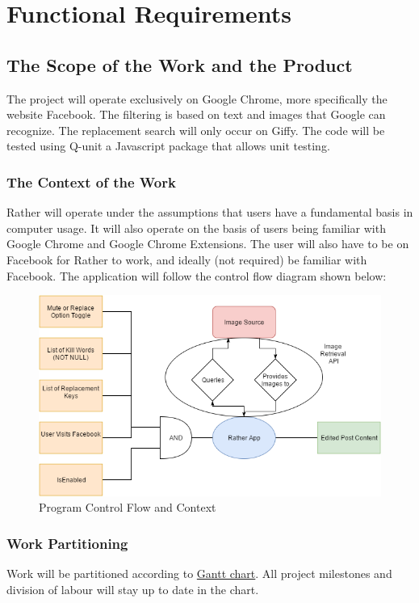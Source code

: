 \documentclass[12pt, titlepage]{article}
\begin{document}
\section{Functional Requirements}


\subsection{The Scope of the Work and the Product}
The project will operate exclusively on Google Chrome, more specifically the website Facebook. The filtering is based on text and images that Google can recognize. The replacement search will only occur on Giffy. The code will be tested using Q-unit a Javascript package that allows unit testing.

\subsubsection{The Context of the Work}
Rather will operate under the assumptions that users have a fundamental basis in computer usage. It will also operate on the basis of users being familiar with Google Chrome and Google Chrome Extensions. The user will also have to be on Facebook for Rather to work, and ideally (not required) be familiar with Facebook. The application will follow the control flow diagram shown below:
\begin{figure}
  \includegraphics[width=\linewidth]{Rather_Control_Flow.png}
  \caption{Program Control Flow and Context}
  \label{fig:Control Flow Diagram}
\end{figure}


\subsubsection{Work Partitioning}
Work will be partitioned according to \href{../DevelopmentPlan/Dev_Plan_Rev0.gan}{Gantt chart}. All project milestones and division of labour will stay up to date in the chart.
\end{document}
